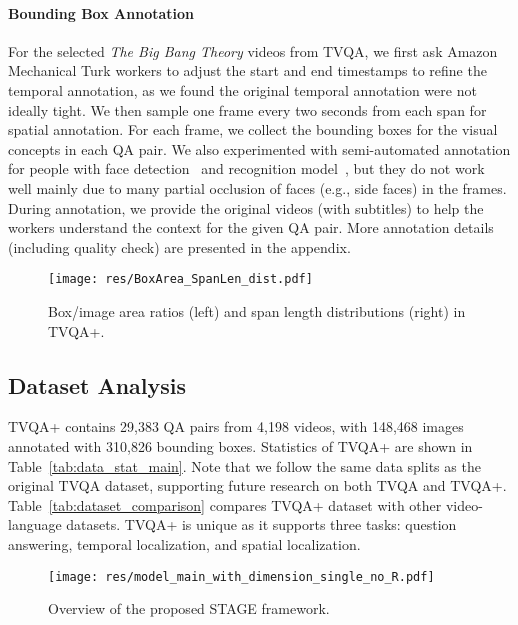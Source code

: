 \documentclass[11pt,a4paper]{article}
\begin{document}
\paragraph{Bounding Box Annotation} 
For the selected \textit{The Big Bang Theory} videos from TVQA, we first ask Amazon Mechanical Turk workers to adjust the start and end timestamps to refine the temporal annotation, as we found the original temporal annotation were not ideally tight.
We then sample one frame every two seconds from each span for spatial annotation.
For each frame, we collect the bounding boxes for the visual concepts in each QA pair.  
We also experimented with semi-automated annotation for people with face detection~\cite{zhang2016joint} and recognition model~\cite{liu2017sphereface}, but they do not work well mainly due to many partial occlusion of faces (e.g., side faces) in the frames.
During annotation, we provide the original videos (with subtitles) to help the workers understand the context for the given QA pair. 
More annotation details (including quality check) are presented in the appendix.



\begin{figure}[t]
  \texttt{[image: res/BoxArea\_SpanLen\_dist.pdf]}
  \caption{Box/image area ratios (left) and span length distributions (right) in TVQA+.}
  \label{fig:box_area_span_len}
\end{figure} 


\subsection{Dataset Analysis}
TVQA+ contains 29,383 QA pairs from 4,198 videos, with 148,468 images annotated with 310,826 bounding boxes. 
Statistics of TVQA+ are shown in Table~\ref{tab:data_stat_main}. 
Note that we follow the same data splits as the original TVQA dataset, supporting future research on both TVQA and TVQA+.
Table~\ref{tab:dataset_comparison} compares TVQA+ dataset with other video-language datasets. 
TVQA+ is unique as it supports three tasks: question answering, temporal localization, and spatial localization. 

\begin{figure*}[!ht]
\centering
  \texttt{[image: res/model\_main\_with\_dimension\_single\_no\_R.pdf]}
  \caption{Overview of the proposed STAGE framework.}
  \label{fig:model_main}
\end{figure*} 
\end{document}
